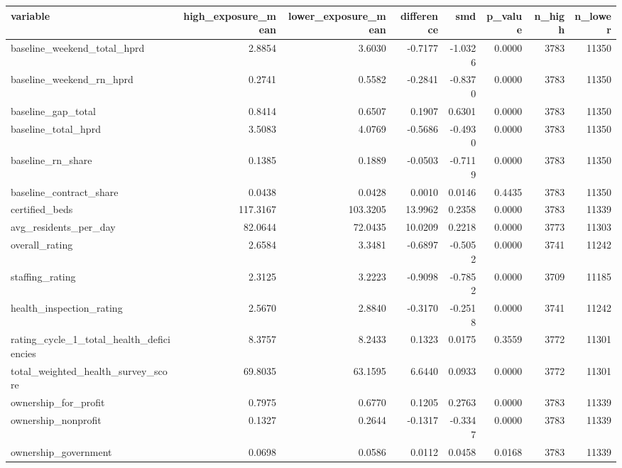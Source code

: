 \begin{tabular}{lrrrrrrr}
\toprule
variable & high_exposure_mean & lower_exposure_mean & difference & smd & p_value & n_high & n_lower \\
\midrule
baseline_weekend_total_hprd & 2.8854 & 3.6030 & -0.7177 & -1.0326 & 0.0000 & 3783 & 11350 \\
baseline_weekend_rn_hprd & 0.2741 & 0.5582 & -0.2841 & -0.8370 & 0.0000 & 3783 & 11350 \\
baseline_gap_total & 0.8414 & 0.6507 & 0.1907 & 0.6301 & 0.0000 & 3783 & 11350 \\
baseline_total_hprd & 3.5083 & 4.0769 & -0.5686 & -0.4930 & 0.0000 & 3783 & 11350 \\
baseline_rn_share & 0.1385 & 0.1889 & -0.0503 & -0.7119 & 0.0000 & 3783 & 11350 \\
baseline_contract_share & 0.0438 & 0.0428 & 0.0010 & 0.0146 & 0.4435 & 3783 & 11350 \\
certified_beds & 117.3167 & 103.3205 & 13.9962 & 0.2358 & 0.0000 & 3783 & 11339 \\
avg_residents_per_day & 82.0644 & 72.0435 & 10.0209 & 0.2218 & 0.0000 & 3773 & 11303 \\
overall_rating & 2.6584 & 3.3481 & -0.6897 & -0.5052 & 0.0000 & 3741 & 11242 \\
staffing_rating & 2.3125 & 3.2223 & -0.9098 & -0.7852 & 0.0000 & 3709 & 11185 \\
health_inspection_rating & 2.5670 & 2.8840 & -0.3170 & -0.2518 & 0.0000 & 3741 & 11242 \\
rating_cycle_1_total_health_deficiencies & 8.3757 & 8.2433 & 0.1323 & 0.0175 & 0.3559 & 3772 & 11301 \\
total_weighted_health_survey_score & 69.8035 & 63.1595 & 6.6440 & 0.0933 & 0.0000 & 3772 & 11301 \\
ownership_for_profit & 0.7975 & 0.6770 & 0.1205 & 0.2763 & 0.0000 & 3783 & 11339 \\
ownership_nonprofit & 0.1327 & 0.2644 & -0.1317 & -0.3347 & 0.0000 & 3783 & 11339 \\
ownership_government & 0.0698 & 0.0586 & 0.0112 & 0.0458 & 0.0168 & 3783 & 11339 \\
\bottomrule
\end{tabular}
